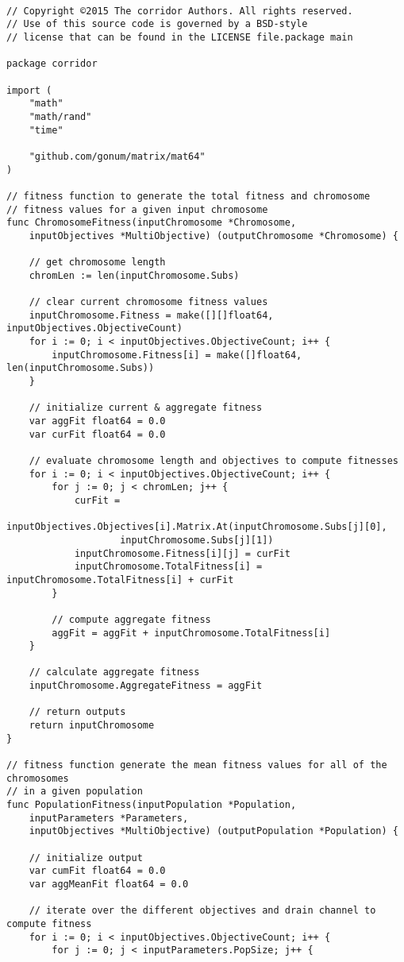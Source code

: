 \begin{lstlisting}[basicstyle=\tiny]

// Copyright ©2015 The corridor Authors. All rights reserved.
// Use of this source code is governed by a BSD-style
// license that can be found in the LICENSE file.package main

package corridor

import (
	"math"
	"math/rand"
	"time"

	"github.com/gonum/matrix/mat64"
)

// fitness function to generate the total fitness and chromosome
// fitness values for a given input chromosome
func ChromosomeFitness(inputChromosome *Chromosome, 
    inputObjectives *MultiObjective) (outputChromosome *Chromosome) {

	// get chromosome length
	chromLen := len(inputChromosome.Subs)

	// clear current chromosome fitness values
	inputChromosome.Fitness = make([][]float64, inputObjectives.ObjectiveCount)
	for i := 0; i < inputObjectives.ObjectiveCount; i++ {
		inputChromosome.Fitness[i] = make([]float64, len(inputChromosome.Subs))
	}

	// initialize current & aggregate fitness
	var aggFit float64 = 0.0
	var curFit float64 = 0.0

	// evaluate chromosome length and objectives to compute fitnesses
	for i := 0; i < inputObjectives.ObjectiveCount; i++ {
		for j := 0; j < chromLen; j++ {
			curFit = 
			    inputObjectives.Objectives[i].Matrix.At(inputChromosome.Subs[j][0], 
			        inputChromosome.Subs[j][1])
			inputChromosome.Fitness[i][j] = curFit
			inputChromosome.TotalFitness[i] = inputChromosome.TotalFitness[i] + curFit
		}

		// compute aggregate fitness
		aggFit = aggFit + inputChromosome.TotalFitness[i]
	}

	// calculate aggregate fitness
	inputChromosome.AggregateFitness = aggFit

	// return outputs
	return inputChromosome
}

// fitness function generate the mean fitness values for all of the chromosomes
// in a given population
func PopulationFitness(inputPopulation *Population, 
    inputParameters *Parameters, 
    inputObjectives *MultiObjective) (outputPopulation *Population) {

	// initialize output
	var cumFit float64 = 0.0
	var aggMeanFit float64 = 0.0

	// iterate over the different objectives and drain channel to compute fitness
	for i := 0; i < inputObjectives.ObjectiveCount; i++ {
		for j := 0; j < inputParameters.PopSize; j++ {


\end{lstlisting}
